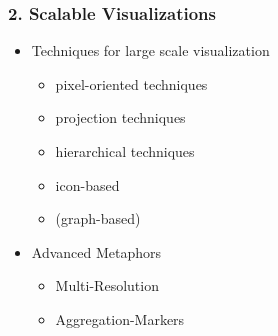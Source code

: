 \begin{frame}
	\frametitle{2. Scalable Visualizations}
	\begin{itemize}
		\item Techniques for large scale visualization
		\begin{itemize}
		    \item pixel-oriented techniques
		    \item projection techniques
		    \item hierarchical techniques
		    \item icon-based
		    \item (graph-based) 
		\end{itemize}
		\item Advanced Metaphors
		\begin{itemize}
		    \item Multi-Resolution
		    \item Aggregation-Markers
		\end{itemize}
	\end{itemize}
\end{frame}

